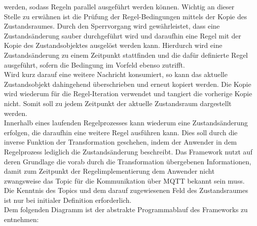        werden, sodass Regeln parallel ausgeführt werden können.  
        Wichtig an dieser Stelle zu 
        erwähnen ist die Prüfung der Regel-Bedingungen mittels der Kopie des Zustandsraumes. 
        Durch den Sperrvorgang wird gewährleistet, dass eine Zustandsänderung sauber durchgeführt wird und daraufhin eine Regel mit der 
        Kopie des Zustandsobjektes ausgelöst werden kann. Hierdurch wird eine Zustandsänderung zu einem 
        Zeitpunkt stattfinden und die dafür definierte Regel ausgeführt, sofern die Bedingung im Vorfeld ebenso zutrifft. 
        \\
        Wird kurz darauf eine weitere Nachricht konsumiert, so kann das aktuelle Zustandsobjekt dahingehend überschrieben und erneut 
        kopiert werden. Die Kopie wird wiederum für die Regel-Iteration verwendet und tangiert die vorherige Kopie nicht. Somit soll 
        zu jedem Zeitpunkt der aktuelle Zustandsraum dargestellt werden. 
        \\
        \linebreak
        Innerhalb eines laufenden Regelprozesses kann wiederum eine Zustandsänderung erfolgen, die daraufhin eine weitere Regel ausführen kann. 
        Dies soll durch die inverse Funktion der Transformation geschehen, indem der 
        Anwender in dem Regelprozess lediglich die Zustandsänderung beschreibt. Das Framework nutzt auf deren Grundlage die vorab durch die Transformation 
        übergebenen Informationen, damit zum Zeitpunkt der Regelimplementierung dem Anwender nicht zwangsweise das Topic für die Kommunikation über \acs{MQTT} 
        bekannt sein muss. Die Kenntnis des Topics und dem darauf zugewiesenen Feld des Zustandsraumes ist nur bei initialer Definition erforderlich. 
        \\
        \linebreak
        Dem folgenden Diagramm ist der abstrakte Programmablauf des Frameworks zu entnehmen:

